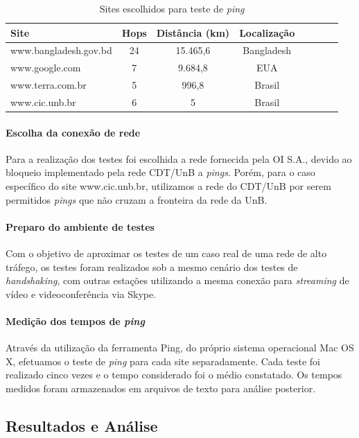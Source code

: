 \documentclass[12pt,a4paper]{report}
\begin{document}
\begin{table}[h]
	\center
	\begin{tabular}{l*{6}{c}r}
	Site						& Hops	& Distância (km)	& Localização\\
	\hline
	www.bangladesh.gov.bd		& 24		& 15.465,6		& Bangladesh\\
	www.google.com			& 7		& 9.684,8			& EUA\\
	www.terra.com.br			& 5		& 996,8			& Brasil\\
	www.cic.unb.br				& 6		& 5				& Brasil\\
	\end{tabular}
	\caption{Sites escolhidos para teste de \textit{ping}}
	\label{tab:sitesping}
\end{table}

\paragraph{Escolha da conexão de rede} Para a realização dos testes foi escolhida a rede fornecida pela OI S.A., devido ao bloqueio implementado pela rede CDT/UnB a \textit{pings}. Porém, para o caso específico do site www.cic.unb.br, utilizamos a rede do CDT/UnB por serem permitidos \textit{pings} que não cruzam a fronteira da rede da UnB.

\paragraph{Preparo do ambiente de testes} Com o objetivo de aproximar os testes de um caso real de uma rede de alto tráfego, os testes foram realizados sob a mesmo cenário dos testes de \textit{handshaking}, com outras estações utilizando a mesma conexão para \textit{streaming} de vídeo e videoconferência via Skype.

\paragraph{Medição dos tempos de \textit{ping}} Através da utilização da ferramenta Ping, do próprio sistema operacional Mac OS X, efetuamos o teste de \textit{ping} para cada site separadamente. Cada teste foi realizado cinco vezes e o tempo considerado foi o médio constatado. Os tempos medidos foram armazenados em arquivos de texto para análise posterior.

\subsection{Resultados e Análise}
\end{document}
